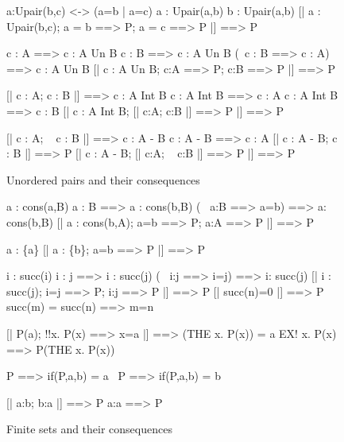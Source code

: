 \begin{figure}
\begin{ttbox}
      a:Upair(b,c) <-> (a=b | a=c)
      a : Upair(a,b)
      b : Upair(a,b)
       [| a : Upair(b,c);  a = b ==> P;  a = c ==> P |] ==> P

         c : A ==> c : A Un B
         c : B ==> c : A Un B
         (~c : B ==> c : A) ==> c : A Un B
          [| c : A Un B;  c:A ==> P;  c:B ==> P |] ==> P

         [| c : A;  c : B |] ==> c : A Int B
        c : A Int B ==> c : A
        c : A Int B ==> c : B
         [| c : A Int B;  [| c:A; c:B |] ==> P |] ==> P

        [| c : A;  ~ c : B |] ==> c : A - B
       c : A - B ==> c : A
       [| c : A - B;  c : B |] ==> P
        [| c : A - B;  [| c:A; ~ c:B |] ==> P |] ==> P
\end{ttbox}
\caption{Unordered pairs and their consequences} \label{ZF-upair1}
\end{figure}


\begin{figure}
\begin{ttbox}
       a : cons(a,B)
       a : B ==> a : cons(b,B)
       (~ a:B ==> a=b) ==> a: cons(b,B)
        [| a : cons(b,A);  a=b ==> P;  a:A ==> P |] ==> P

   a : \{a\}
   [| a : \{b\}; a=b ==> P |] ==> P

       i : succ(i)
       i : j ==> i : succ(j)
       (~ i:j ==> i=j) ==> i: succ(j)
        [| i : succ(j);  i=j ==> P;  i:j ==> P |] ==> P
   [| succ(n)=0 |] ==> P
  succ(m) = succ(n) ==> m=n

     [| P(a);  !!x. P(x) ==> x=a |] ==> (THE x. P(x)) = a
             EX! x. P(x) ==> P(THE x. P(x))

             P ==> if(P,a,b) = a
        ~P ==> if(P,a,b) = b

     [| a:b;  b:a |] ==> P
    a:a ==> P
\end{ttbox}
\caption{Finite sets and their consequences} \label{ZF-upair2}
\end{figure}


